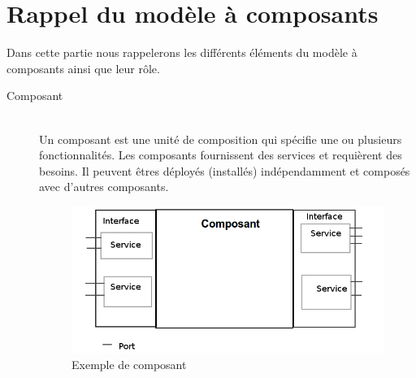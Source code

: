 
\section{Rappel du modèle à composants}
Dans cette partie nous rappelerons les différents éléments du modèle à composants ainsi que leur rôle.

\begin{description}
\item[Composant] \hfill \\
  Un composant est une unité de composition qui spécifie  une ou plusieurs fonctionnalités. Les composants fournissent des services et requièrent des besoins. Il peuvent êtres déployés (installés) indépendamment et composés avec d'autres composants.
\begin{figure}[htb]
  \centering
  \includegraphics[scale=0.36]{img/composant}
  \caption{Exemple de composant}
  \label{fig:compo}
\end{figure}
 

\end{description}
